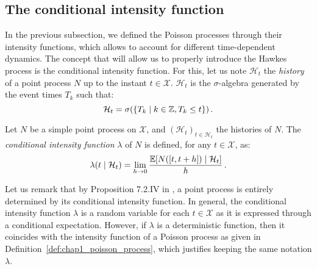 \subsection{The conditional intensity function}

In the previous subsection, we defined the Poisson processes through their intensity functions, which allows to account for different time-dependent dynamics.
The concept that will allow us to properly introduce the Hawkes process is the conditional intensity function.
For this, let us note $\mathcal{H}_t$ the \emph{history} of a point process $N$ up to the instant $t\in\mathcal{X}$. 
$\mathcal{H}_t$ is the $\sigma$-algebra generated by the event times $T_k$ such that:
\[\mathcal{H}_t = \sigma(\{T_k \mid k\in{\mathbb Z}, T_k \leq t\})\,.\]

\begin{definition}\label{def:chap1_conditional_intensity}
    Let $N$ be a simple point process on $\mathcal{X}$, and $(\mathcal{H}_t)_{t\in\mathcal{H}_t}$ the histories of $N$.
    The \emph{conditional intensity function} $\lambda$ of $N$ is defined, for any $t\in\mathcal{X}$, as:
    \begin{equation}\label{eq:chap1_conditional_intensity}
        \lambda(t \mid \mathcal{H}_t) = \lim_{h \to 0}{\frac{{\mathbb E}[N([t,t+h]) \mid \mathcal{H}_t]}{h}}\,.
    \end{equation}
\end{definition}
Let us remark that by Proposition 7.2.IV in \textcite{DaleyV1}, a point process is entirely determined by its conditional intensity function.
In general, the conditional intensity function $\lambda$ is a random variable for each $t\in\mathcal{X}$ as it is expressed through a conditional expectation.
However, if $\lambda$ is a deterministic function, then it coincides with the intensity function of a Poisson process as given in Definition~\ref{def:chap1_poisson_process}, which justifies keeping the same notation $\lambda$. 

